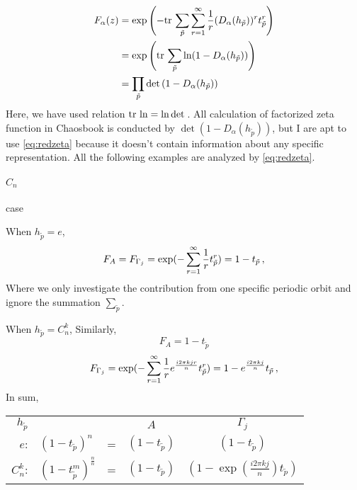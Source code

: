 \begin{align*}
  F_\alpha (z) & =
                 {\rm exp}  \left( -
                 \mathrm{tr}\, \sum_{\tilde{p}} \sum_{r=1}^\infty {1 \over r}
                 (D_{\alpha}(h_{\tilde{p}}))^{r} t_{\tilde{p}}^{r} \right) \\
               & ={\rm exp}  \left(
                 \mathrm{tr}\, \sum_{\tilde{p}} \ln (1-D_{\alpha}(h_{\tilde{p}}))
                 \right) \\
               & = \prod_{\tilde{p}} \mathrm{det}\,(1-D_{\alpha}(h_{\tilde{p}}))
\end{align*}
Here, we have used relation $\mathrm{tr}\, \ln= \ln \mathrm{det}\,$. All calculation of
factorized zeta function in Chaosbook is conducted by
$\det(1-D_{\alpha}(h_{\tilde{p}}))$, but I are apt to use \eqref{eq:redzeta}
because it doesn't contain information about any specific representation.
All the following examples are analyzed by \eqref{eq:redzeta}.

\paragraph{$C_{n}$} case

When $h_{\tilde p}=e$,
\[
  F_{A}=F_{\Gamma_j}={\rm exp} (-\sum_{r=1}^\infty {1 \over r}t_{\tilde{p}}^{r} )
  =1-t_{\tilde p}
  \,,
\]
Where we only investigate the contribution from one specific periodic
orbit and ignore the summation $ \sum_{\tilde{p}}$.

When $h_{\tilde p}=C_n^k$, Similarly,
\[
  F_{A}=1-t_{\tilde p}
\]
\[
  F_{\Gamma_j}={\rm exp} (-\sum_{r=1}^\infty {1 \over r}e^{\frac{i2\pi kjr}{n}}
  t_{\tilde{p}}^{r} )
  =1-e^{\frac{i2\pi kj}{n}} t_{\tilde p}
  \,,
\]
In sum,
\vskip 12pt
\begin{tabular}{rlccc}

  $h_{\tilde p}$ &  & &  $A$  &  $\Gamma_{j}$ \\
  $e$:
                 & $(1-t_{\tilde p} )^n$  &=&$(1-t_{\tilde p})$ & $(1-t_{\tilde p})$  \\
  $C_n^{k}$:
                 & $(1-t_{\tilde p}^m )^{\frac{n}{n}}$ &=&  $(1-t_{\tilde p})$ & $(1-\exp(\frac{i2\pi kj}{n})t_{\tilde p})$ \\
\end{tabular}
\vskip 12pt
\noindent


